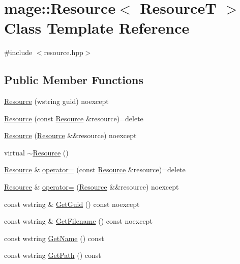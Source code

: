 \hypertarget{classmage_1_1_resource}{}\section{mage\+:\+:Resource$<$ ResourceT $>$ Class Template Reference}
\label{classmage_1_1_resource}


{\ttfamily \#include $<$resource.\+hpp$>$}

\subsection*{Public Member Functions}
\begin{DoxyCompactItemize}
\item 
\hyperlink{classmage_1_1_resource_a397a81a1195dea231776db9787cad52d}{Resource} (wstring guid) noexcept
\item 
\hyperlink{classmage_1_1_resource_a53da586d9bae285ab50c4cca2421a9ce}{Resource} (const \hyperlink{classmage_1_1_resource}{Resource} \&resource)=delete
\item 
\hyperlink{classmage_1_1_resource_adfff024cb267644156ba1b357d6f8d10}{Resource} (\hyperlink{classmage_1_1_resource}{Resource} \&\&resource) noexcept
\item 
virtual \hyperlink{classmage_1_1_resource_a56a3ac799224e100b271b65ec455b59e}{$\sim$\+Resource} ()
\item 
\hyperlink{classmage_1_1_resource}{Resource} \& \hyperlink{classmage_1_1_resource_a938159cb02ec565b9b957f993db4769d}{operator=} (const \hyperlink{classmage_1_1_resource}{Resource} \&resource)=delete
\item 
\hyperlink{classmage_1_1_resource}{Resource} \& \hyperlink{classmage_1_1_resource_aa1f7a7ddd31f4fc16293b4a5ca9a93c8}{operator=} (\hyperlink{classmage_1_1_resource}{Resource} \&\&resource) noexcept
\item 
const wstring \& \hyperlink{classmage_1_1_resource_adaa2464cb1fdb51a3f6028c0f316d083}{Get\+Guid} () const noexcept
\item 
const wstring \& \hyperlink{classmage_1_1_resource_a21bed60ba52a741eaffddc953f241be7}{Get\+Filename} () const noexcept
\item 
const wstring \hyperlink{classmage_1_1_resource_a6414c6f8342f4cc92e7ed7861000cd2f}{Get\+Name} () const
\item 
const wstring \hyperlink{classmage_1_1_resource_a01cb4f6f8ff66a1f2545edc89af656c9}{Get\+Path} () const
\end{DoxyCompactItemize}
